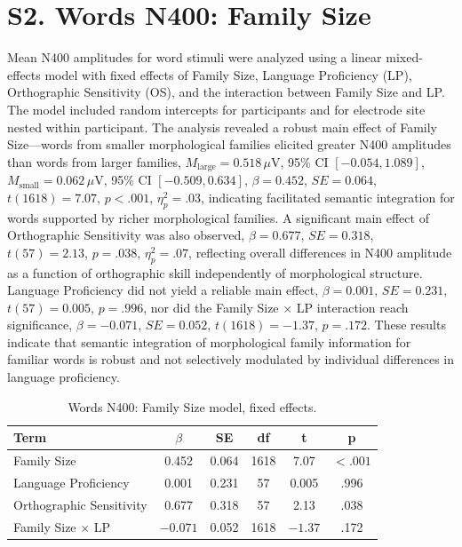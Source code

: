 \documentclass[11pt]{article}
\begin{document}
\section*{S2. Words N400: Family Size}

Mean N400 amplitudes for word stimuli were analyzed using a linear mixed-effects model with fixed effects of Family Size, Language Proficiency (LP), Orthographic Sensitivity (OS), and the interaction between Family Size and LP. The model included random intercepts for participants and for electrode site nested within participant. The analysis revealed a robust main effect of Family Size---words from smaller morphological families elicited greater N400 amplitudes than words from larger families, $M_{\mathrm{large}} = 0.518\,\mu$V, 95\% CI $[-0.054, 1.089]$, $M_{\mathrm{small}} = 0.062\,\mu$V, 95\% CI $[-0.509, 0.634]$, $\beta = 0.452$, $SE = 0.064$, $t(1618) = 7.07$, $p < .001$, $\eta^2_p = .03$, indicating facilitated semantic integration for words supported by richer morphological families. A significant main effect of Orthographic Sensitivity was also observed, $\beta = 0.677$, $SE = 0.318$, $t(57) = 2.13$, $p = .038$, $\eta^2_p = .07$, reflecting overall differences in N400 amplitude as a function of orthographic skill independently of morphological structure. Language Proficiency did not yield a reliable main effect, $\beta = 0.001$, $SE = 0.231$, $t(57) = 0.005$, $p = .996$, nor did the Family Size $\times$ LP interaction reach significance, $\beta = -0.071$, $SE = 0.052$, $t(1618) = -1.37$, $p = .172$. These results indicate that semantic integration of morphological family information for familiar words is robust and not selectively modulated by individual differences in language proficiency.

\begin{table}[h!]
	\centering
	\small
	\caption{Words N400: Family Size model, fixed effects.}
	\label{tab:s2}
	\begin{tabular}{lccccc}
		\toprule
		\textbf{Term} & $\beta$ & \textbf{SE} & \textbf{df} & \textbf{t} & \textbf{p} \\
		\midrule
		Family Size & 0.452 & 0.064 & 1618 & 7.07 & $< .001$ \\
		Language Proficiency & 0.001 & 0.231 & 57 & 0.005 & .996 \\
		Orthographic Sensitivity & 0.677 & 0.318 & 57 & 2.13 & .038 \\
		Family Size $\times$ LP & $-0.071$ & 0.052 & 1618 & $-1.37$ & .172 \\
		\bottomrule
	\end{tabular}
\end{table}
\end{document}

